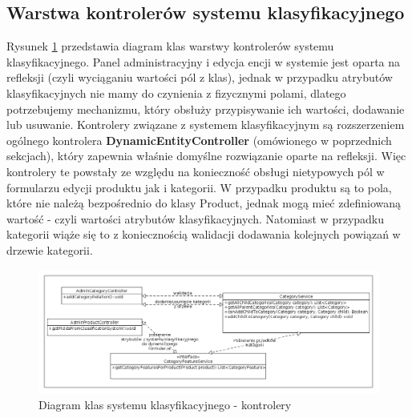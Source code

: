 \subsection{Warstwa kontrolerów systemu klasyfikacyjnego}
Rysunek \ref{klasy_kontrolery_sysKlas} przedstawia diagram klas warstwy kontrolerów systemu klasyfikacyjnego. Panel administracyjny i edycja encji w systemie jest oparta na refleksji (czyli wyciąganiu wartości pól z klas), jednak w przypadku atrybutów klasyfikacyjnych nie mamy do czynienia z fizycznymi polami, dlatego potrzebujemy mechanizmu, który obsłuży przypisywanie ich wartości, dodawanie lub usuwanie. Kontrolery związane z systemem klasyfikacyjnym są rozszerzeniem ogólnego kontrolera \textbf{DynamicEntityController} (omówionego w poprzednich sekcjach), który zapewnia właśnie domyślne rozwiązanie oparte na refleksji. Więc kontrolery te powstały ze względu na konieczność obsługi nietypowych pól w formularzu edycji produktu jak i kategorii. W przypadku produktu są to pola, które nie należą bezpośrednio do klasy Product, jednak mogą mieć zdefiniowaną wartość - czyli wartości atrybutów klasyfikacyjnych. Natomiast w przypadku kategorii wiąże się to z koniecznością walidacji dodawania kolejnych powiązań w drzewie kategorii. 
\begin{figure}
	\begin{center}
		\includegraphics[scale=0.4]{klasy_kontrolery_sysKlas.png}
	\end{center}
	\caption{{\color{black}Diagram klas systemu klasyfikacyjnego - kontrolery}} \label{klasy_kontrolery_sysKlas}
\end{figure}

